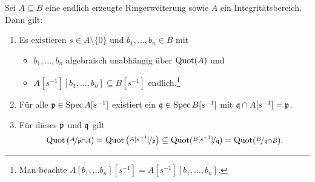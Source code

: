 \documentclass[12pt,a4paper]{scrartcl}
\theoremstyle{cplain}
\theoremstyle{cdef}
\begin{document}
\begin{kor} \label{kor:7.17}
	Sei $A \subseteq B$ eine endlich erzeugte Ringerweiterung sowie $A$ ein Integritätsbereich. Dann gilt: 
	\begin{enumerate}
		\item \label{kor:7.17:i} Es existieren $s \in A \setminus \{0\}$ und $b_1, \dots , b_n \in B$ mit
		\begin{itemize}
			\item $b_1, \dots , b_n$ algebraisch unabhängig über $\operatorname{Quot}(A)$ und
			\item $A[s^{-1}][b_1,\dots , b_n] \subseteq B[s^{-1}]$ endlich.\footnote{Man beachte $A[b_1, \dots b_n][s^{-1}]=A[s^{-1}][b_1, \dots , b_n]$.}
		\end{itemize}
		\item \label{kor:7.17:iii} Für alle $\mathfrak{p}\in\operatorname{Spec} A [s^{-1}]$ existiert ein $\mathfrak{q} \in \operatorname{Spec} B[s^{-1}]$ mit $\mathfrak{q} \cap A[s^{-1}]=\mathfrak{p}$. \label{kor:7.17:ii}
		\item  Für dieses $\mathfrak{p}$ und $\mathfrak{q}$ gilt \[\operatorname{Quot}\left( \nicefrac{A}{\mathfrak{p} \cap A} \right)=\operatorname{Quot} \left( \nicefrac{A[s^{-1}]}{\mathfrak{p}} \right) \subseteq \operatorname{Quot}(\nicefrac{B[s^{-1}]}{\mathfrak{q}})=\operatorname{Quot}(\nicefrac{B}{\mathfrak{q} \cap B}).\]
	\end{enumerate}
\end{kor}
\end{document}
